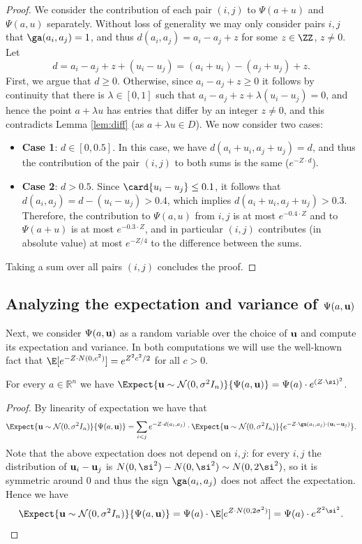 \begin{proof}
   We consider the contribution of each pair $(i,j)$ to $\Psi(a+u)$ and $\Psi(a,u)$ separately.
   Without loss of generality we may only consider pairs $i,j$ that $\ga(a_i,a_j)=1$,
   and thus $d(a_i,a_j)= a_i - a_j + z$ for some $z\in \ZZ$, $z\neq 0$.
   Let
   \[
   d= a_i - a_j + z + (u_i-u_j) = (a_i+u_i)- (a_j+u_j)+z.
   \]
   First, we argue that $d\geq 0$. Otherwise, since $a_i-a_j + z \geq 0$ it follows by continuity that there is
   $\lambda\in[0,1]$ such that $a_i - a_j + z + \lambda(u_i-u_j) = 0$, and hence the point $a+\lambda u$ has entries
   that differ by an integer $z\neq 0$, and this contradicts Lemma \ref{lem:diff} (as $a+\lambda u \in D$).
   We now consider two cases:
   \begin{itemize}
     \item {\bf Case 1}: $d \in [0,0.5]$. In this case, we have $d(a_i+u_i, a_j+u_j) = d$, and thus the contribution of the pair $(i,j)$ to both sums is the same ($e^{-Z\cdot d}$).
     \item {\bf Case 2}: $d > 0.5$. Since $\card{u_i-u_j}\leq 0.1$, it follows that $d(a_i,a_j) = d -(u_i-u_j) > 0.4$, which implies $d(a_i+u_i,a_j+u_j) > 0.3$. Therefore, the
     contribution to $\Psi(a,u)$ from $i,j$ is at most $e^{-0.4\cdot Z}$ and to $\Psi(a+u)$ is at most $e^{-0.3 \cdot Z}$, and in particular $(i,j)$ contributes (in absolute value)
     at most $e^{-Z/4}$ to the difference between the sums.
   \end{itemize}
   Taking a sum over all pairs $(i,j)$ concludes the proof.
\end{proof}


\subsection{Analyzing the expectation and variance of $\Psi(a,{\bf u})$}
Next,
we consider $\Psi(a,{\bf u})$ as a random variable over the choice of ${\bf u}$
and compute its expectation and variance. In both computations we will use
the well-known fact that $\E[e^{-Z\cdot N(0, c^2)}]=e^{Z^2 c^2/2}$ for all $c> 0$.

\begin{claim}
\label{cl:2}
For every $a\in\mathbb{R}^n$ we have $\Expect{{\bf u}\sim \mathcal{N}(0,\sigma^2 I_n)}{\Psi(a,{\bf u})} =\Psi(a)\cdot e^{(Z \cdot \si)^2}$.
\end{claim}

\begin{proof}
    By linearity of expectation we have that
	\[
	\Expect{{\bf u}\sim \mathcal{N}(0,\sigma^2I_n)}{\Psi(a,{\bf u})}
= \sum_{i<j} e^{-Z \cdot d(a_i,a_j)}\cdot \Expect{{\bf u}\sim \mathcal{N}(0,\sigma^2I_n)}{e^{-Z\cdot \ga(a_i,a_j)\cdot ({\bf u}_i-{\bf u}_j)}}.
	\]
    Note that the above expectation does not depend on $i,j$: for every $i,j$ the distribution of
    ${\bf u}_i - {\bf u}_j$ is $N(0,\si^2)-N(0,\si^2)\sim N(0,2\si^2)$, so it is symmetric around $0$ and thus
    the sign $\ga(a_i,a_j)$ does not affect the expectation. Hence we have
    \[
    \Expect{{\bf u}\sim \mathcal{N}(0,\sigma^2I_n)}{\Psi(a,{\bf u})}   = \Psi(a) \cdot \E [e^{Z\cdot N(0,2\sigma^2)}]
	=\Psi(a)\cdot e^{Z^2\si^2}.\qedhere
    \]
\end{proof}


